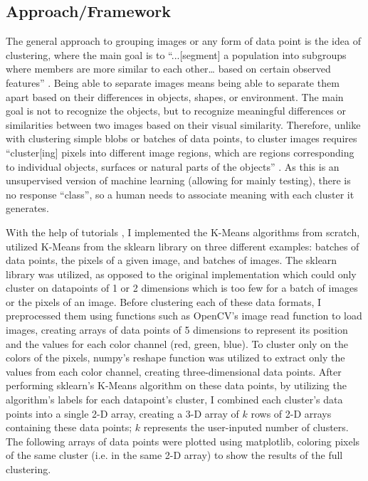 \documentclass[10pt,twocolumn]{article}
\begin{document}
\subsection {Approach/Framework}

The general approach to grouping images or any form of data point is the idea of clustering, where the main goal is to “...[segment] a population into subgroups where members are more similar to each other… based on certain observed features” \cite{C3Clustering}. Being able to separate images means being able to separate them apart based on their differences in objects, shapes, or environment. The main goal is not to recognize the objects, but to recognize meaningful differences or similarities between two images based on their visual similarity. Therefore, unlike with clustering simple blobs or batches of data points, to cluster images requires “cluster[ing] pixels into different image regions, which are regions corresponding to individual objects, surfaces or natural parts of the objects” \cite{Roy2014}. As this is an unsupervised version of machine learning (allowing for mainly testing), there is no response “class”, so a human needs to associate meaning with each cluster it generates.

With the help of tutorials \cite{Khushijain2021, Jordan2018, Aktas2021}, I implemented the K-Means algorithms from scratch, utilized K-Means from the sklearn library on three different examples: batches of data points, the pixels of a given image, and batches of images. The sklearn library was utilized, as opposed to the original implementation which could only cluster on datapoints of 1 or 2 dimensions which is too few for a batch of images or the pixels of an image. Before clustering each of these data formats, I preprocessed them using functions such as OpenCV’s image read function to load images, creating arrays of data points of 5 dimensions to represent its position and the values for each color channel (red, green, blue). To cluster only on the colors of the pixels, numpy’s reshape function was utilized to extract only the values from each color channel, creating three-dimensional data points. After performing sklearn’s K-Means algorithm on these data points, by utilizing the algorithm’s labels for each datapoint’s cluster, I combined each cluster’s data points into a single 2-D array, creating a 3-D array of \(k\) rows of 2-D arrays containing these data points; \(k\) represents the user-inputed number of clusters. The following arrays of data points were plotted using matplotlib, coloring pixels of the same cluster (i.e. in the same 2-D array) to show the results of the full clustering.
\end{document}
